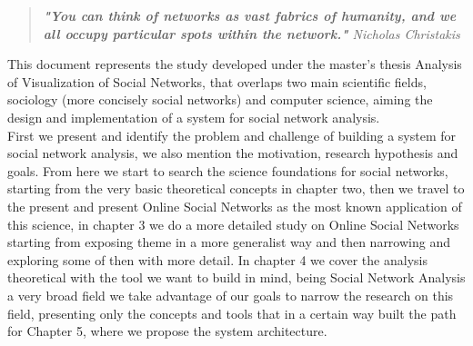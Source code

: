 
\begin{quote}
\textit{\textbf{"You can think of networks as vast fabrics of humanity, and we all occupy particular spots within the network."} Nicholas Christakis}
\end{quote}

This document represents the study developed under the master's thesis Analysis of Visualization of Social Networks, that overlaps
two main scientific fields, sociology (more concisely social networks) and computer science, aiming the design and implementation of a system for social
network analysis.\\

\indent First we present and identify the problem and challenge of building a system for social network analysis, we also mention the motivation,
research hypothesis and goals. From here we start to search the science foundations for social networks, starting from the very basic theoretical concepts in chapter two, then we travel to the present and present Online Social Networks as the most known application of this science, in chapter 3 we do a more detailed study on Online Social Networks starting from exposing theme in a more generalist way and then narrowing and exploring some of then with more detail. In chapter 4 we cover the analysis theoretical with the tool we want to build in mind, being Social Network Analysis a very broad field we take advantage of our goals to narrow the research on this field, presenting only the concepts and tools that in a certain way built the path for Chapter 5, where we propose the system architecture.\\

